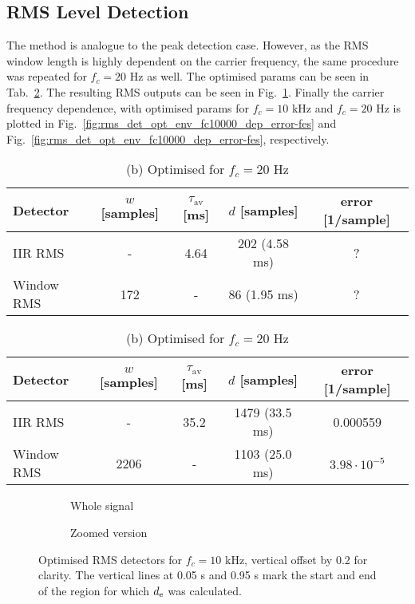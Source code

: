 \documentclass[../main2.tex]{subfiles}
\providecommand{\rootdir}{..}
\begin{document}
\subsection{RMS Level Detection}
The method is analogue to the peak detection case. However, as the RMS window length is highly dependent on the carrier frequency, the same procedure was repeated for $f_c = 20$ Hz as well. The optimised params can be seen in Tab.~\ref{tab:rms_det_opt_params}.  The resulting RMS outputs can be seen in Fig.~\ref{fig:rms_opt_10000}. Finally the carrier frequency dependence, with optimised params for $f_c=10$ kHz and $f_c=20$ Hz is plotted in Fig.~\ref{fig:rms_det_opt_env_fc10000_dep_error-fes} and Fig.~\ref{fig:rms_det_opt_env_fc10000_dep_error-fes}, respectively.
\begin{table}[h]
\begin{center}
\caption{Optimised parameters for the two RMS detectors}
\label{tab:rms_det_opt_params_10000}
\caption*{(a) Optimised for $f_c=10$ kHz}
 \begin{tabular}{| l | c c c | c |}
	\hline
	Detector & $w$ [samples] & $\tau_\text{av}$ [ms] & $d$ [samples] & error [1/sample] \\
	\hline
	IIR RMS		& -			& 4.64 	& 202 (4.58 ms)		& ?	\\ 
	Window RMS 	& 172	 		& - 	& 86	(1.95 ms)	& ?	\\ 
	\hline
\end{tabular}
\end{center}

\begin{center}
\caption*{(b) Optimised for $f_c=20$ Hz}
\label{tab:rms_det_opt_params_20}
 \begin{tabular}{| l | c c c | c |}
	\hline
	Detector & $w$ [samples] & $\tau_\text{av}$ [ms] & $d$ [samples] & error [1/sample] \\
	\hline
	IIR RMS			& - 			& 35.2 	& 1479 (33.5 ms)		& 0.000559\\ 
	Window RMS 	& 2206	 		& - 	& 1103 (25.0 ms)		& $3.98\cdot10^{-5}$		\\ 
	\hline
\end{tabular}
\end{center}
\label{tab:rms_det_opt_params}
\end{table}
\begin{figure}[h]
\captionsetup{justification=centering}
\begin{subfigure}{\linewidth}
\centerline{}
\caption{Whole signal}
\end{subfigure}
\par\bigskip
\begin{subfigure}{\linewidth}
\centerline{}
\caption{Zoomed version}
\end{subfigure}
\caption{Optimised RMS detectors for $f_c=10$ kHz, vertical offset by 0.2 for clarity. The vertical lines at 0.05 s and 0.95 s mark the start and end of the region for which $d_\text{e}$ was calculated.}
\label{fig:rms_opt_10000}
\end{figure}
\end{document}
